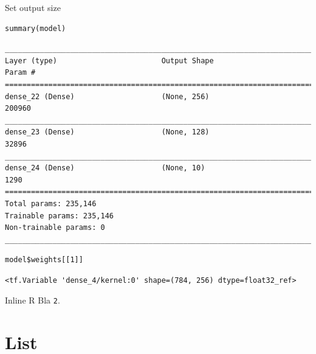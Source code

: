 \documentclass[table]{beamer}
\begin{document}
\begin{frame}[label={sec:org51fffe3},fragile]{Set output size}
 \lstset{language=r,label= ,caption= ,captionpos=b,numbers=none}
\begin{lstlisting}
summary(model)
\end{lstlisting}


{

\begin{verbatim}
________________________________________________________________________________
Layer (type)                        Output Shape                    Param #     
================================================================================
dense_22 (Dense)                    (None, 256)                     200960      
________________________________________________________________________________
dense_23 (Dense)                    (None, 128)                     32896       
________________________________________________________________________________
dense_24 (Dense)                    (None, 10)                      1290        
================================================================================
Total params: 235,146
Trainable params: 235,146
Non-trainable params: 0
________________________________________________________________________________
\end{verbatim}

}

\lstset{language=r,label= ,caption= ,captionpos=b,numbers=none}
\begin{lstlisting}
model$weights[[1]]
\end{lstlisting}

{

\begin{verbatim}
<tf.Variable 'dense_4/kernel:0' shape=(784, 256) dtype=float32_ref>
\end{verbatim}


}
\end{frame}
\begin{frame}[label={sec:org86d8756},fragile]{Inline R}
 Bla \texttt{2}.
\end{frame}

\section{List}
\label{sec:orgeecd729}
\end{document}
